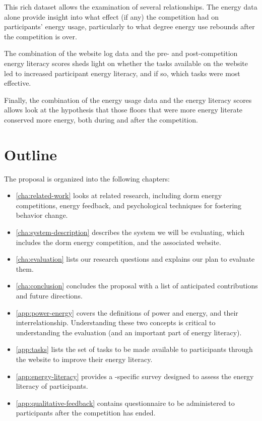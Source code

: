 This rich dataset allows the examination of several relationships. The energy data alone provide insight into what effect (if any) the competition had on participants' energy usage, particularly to what degree energy use rebounds after the competition is over.

The combination of the website log data and the pre- and post-competition energy literacy scores sheds light on whether the tasks available on the website led to increased participant energy literacy, and if so, which tasks were most effective.

Finally, the combination of the energy usage data and the energy literacy scores allows look at the hypothesis that those floors that were more energy literate conserved more energy, both during and after the competition.


\section{Outline}

The proposal is organized into the following chapters:

\begin{itemize}
	\item \autoref{cha:related-work} looks at related research, including dorm energy competitions, energy feedback, and psychological techniques for fostering behavior change.
	\item \autoref{cha:system-description} describes the system we will be evaluating, which includes the dorm energy competition, and the associated website.
	\item \autoref{cha:evaluation} lists our research questions and explains our plan to evaluate them.
	\item \autoref{cha:conclusion} concludes the proposal with a list of anticipated contributions and future directions.
	\item \autoref{app:power-energy} covers the definitions of power and energy, and their interrelationship. Understanding these two concepts is critical to understanding the evaluation (and an important part of energy literacy).
	\item \autoref{app:tasks} lists the set of tasks to be made available to participants through the website to improve their energy literacy.
	\item \autoref{app:energy-literacy} provides a \Hawaii-specific survey designed to assess the energy literacy of participants.
	\item \autoref{app:qualitative-feedback} contains questionnaire to be administered to participants after the competition has ended.
\end{itemize}
